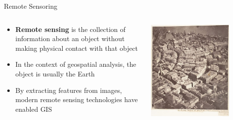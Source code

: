 \documentclass[show notes, aspectratio=1610]{beamer}
\begin{document}
\begin{frame}{Remote Sensoring}{}
	\begin{columns}
		\begin{column}{0.5\textwidth}
			\begin{itemize}
				\item
				      \textbf{Remote sensing} is the collection of information about an
				      object without making physical contact with that object
				\item
				      In the context of geospatial analysis, the object is usually
				      the Earth
				\item
				      By extracting features from images, modern remote sensing
				      technologies have enabled GIS
			\end{itemize}
		\end{column}
		\begin{column}{0.5\textwidth}
			\centering
			\includegraphics[width=0.8\textwidth]{images/56914f0d6cbe4.jpeg}
		\end{column}
	\end{columns}
\end{frame}
\end{document}
